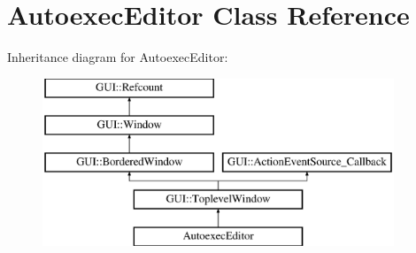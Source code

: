 \hypertarget{classAutoexecEditor}{\section{Autoexec\-Editor Class Reference}
\label{classAutoexecEditor}
}
Inheritance diagram for Autoexec\-Editor\-:\begin{figure}[H]
\begin{center}
\leavevmode
\includegraphics[height=5.000000cm]{classAutoexecEditor}
\end{center}
\end{figure}
